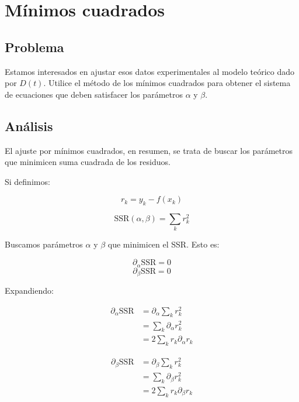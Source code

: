 \section{Mínimos cuadrados}

\subsection{Problema}

Estamos interesados en ajustar esos datos experimentales al modelo teórico
dado por $D(t)$. Utilice el método de los mínimos cuadrados para obtener el sistema
de ecuaciones que deben satisfacer los parámetros $\alpha$ y $\beta$.

\subsection{Análisis}

El ajuste por mínimos cuadrados, en resumen, se trata de buscar los parámetros que minimicen suma cuadrada de los residuos. 

Si definimos:

\begin{equation}
	r_k = y_k - f(x_k)
\end{equation}

\begin{equation}
	\text{SSR}(\alpha, \beta) = \sum_{k} r_k^2 
\end{equation}

Buscamos parámetros $\alpha$ y $\beta$ que minimicen el SSR. Esto es:

\begin{equation}
	\partial_\alpha \text{SSR} = 0
\end{equation}
\begin{equation}
	\partial_\beta \text{SSR} = 0
\end{equation}

Expandiendo:

\begin{align*}
	\partial_\alpha \text{SSR} &= \partial_\alpha \sum_{k} r_k^2 \\
	&= \sum_{k} \partial_\alpha r_k^2 \\
	&= 2 \sum_{k} r_k  \partial_\alpha r_k 
\end{align*} 

\begin{align*}
	\partial_\beta \text{SSR} &= \partial_\beta \sum_{k} r_k^2 \\
	&= \sum_{k} \partial_\beta r_k^2 \\
	&= 2 \sum_{k} r_k \partial_\beta r_k 
\end{align*} 

